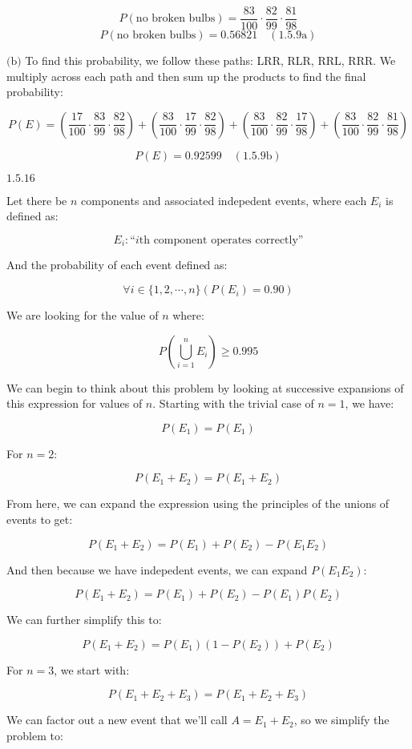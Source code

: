 \documentclass{article}
\newcommand{\problem}[2]{$\boxed{\text{#1.#2}}$}
\newcommand{\subproblem}[3]{$\boxed{\text{(#3)}}$}
\newcommand{\subsolution}[4]{\boxed{#4\quad(\text{#1.#2#3})}}
\begin{document}
\[
P(\text{no broken bulbs})=\dfrac{83}{100}\cdot\dfrac{82}{99}\cdot\dfrac{81}{98}
\] \[
\subsolution{1.5}{9}{a}{P(\text{no broken bulbs})=0.56821}
\]

\subproblem{1.5}{9}{b} To find this probability, we follow these
paths: LRR, RLR, RRL, RRR. We multiply across each path and then sum
up the products to find the final probability:

\[
P(E)=
\left(\dfrac{17}{100}\cdot
\dfrac{83}{99}\cdot
\dfrac{82}{98}\right)
+
\left(\dfrac{83}{100}\cdot
\dfrac{17}{99}\cdot
\dfrac{82}{98}\right)
+
\left(\dfrac{83}{100}\cdot
\dfrac{82}{99}\cdot
\dfrac{17}{98}\right)
+
\left(\dfrac{83}{100}\cdot
\dfrac{82}{99}\cdot
\dfrac{81}{98}\right)
\]

\[
\subsolution{1.5}{9}{b}{P(E)=0.92599}
\]

%
\problem{1.5}{16}

Let there be $n$ components and associated indepedent events, where
each $E_i$ is defined as:

\[
E_i:\text{``$i$th component operates correctly''}
\]

And the probability of each event defined as:

\[
\forall i\in\{1,2,\cdots,n\}(P(E_i)=0.90)
\]

We are looking for the value of $n$ where:

\[
P\left(\bigcup\limits_{i=1}^n E_i\right)\ge 0.995
\]

We can begin to think about this problem by looking at successive
expansions of this expression for values of $n$. Starting with the
trivial case of $n=1$, we have:

\[
P(E_1)=P(E_1)
\]

For $n=2$:

\[
P(E_1+E_2)=P(E_1+E_2)
\]

From here, we can expand the expression using the principles of the
unions of events to get:

\[
P(E_1+E_2)=P(E_1)+P(E_2)-P(E_1E_2)
\]

And then because we have indepedent events, we can expand $P(E_1E_2)$:

\[
P(E_1+E_2)=P(E_1)+P(E_2)-P(E_1)P(E_2)
\]

We can further simplify this to:

\[
P(E_1+E_2)=P(E_1)(1-P(E_2))+P(E_2)
\]

For $n=3$, we start with:

\[
P(E_1+E_2+E_3)=P(E_1+E_2+E_3)
\]

We can factor out a new event that we'll call $A=E_1+E_2$, so we
simplify the problem to:
\end{document}
